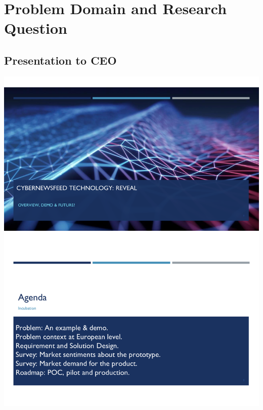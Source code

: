 
\chapter{Problem Domain and Research Question} %
\label{AppendixChapter4} 


\section{Presentation to CEO}\label{Presentation to CEO}

\includegraphics[page=1,scale=0.75]{Appendices/Threat-Brief-Product-marcel.pdf} 
